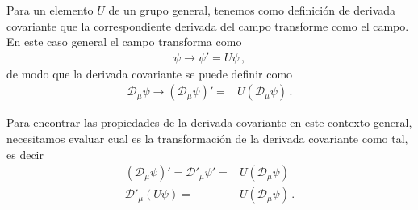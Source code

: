 Para un elemento $U$ de un grupo general, tenemos como definición de derivada covariante que la correspondiente derivada del campo transforme como el campo. En este caso general el campo transforma como
\begin{align}
  \psi\to\psi'=U\psi\,,
\end{align}
de modo que la derivada covariante se puede definir como
\begin{align}
     \mathcal{D}_\mu \psi\to\left(\mathcal{D}_\mu \psi\right)'=&U\left(\mathcal{D}_\mu \psi\right)\,.
\end{align}

Para encontrar las propiedades de la derivada covariante en este contexto general, necesitamos evaluar cual es la transformación de la derivada covariante como tal, es decir
\begin{align}
 \left(\mathcal{D}_\mu \psi\right)'=     \mathcal{D}'_\mu \psi'=&U\left(\mathcal{D}_\mu \psi\right)\nonumber\\
    \mathcal{D}'_\mu \left( U\psi \right)=&U\left(\mathcal{D}_\mu \psi\right)\,.
\end{align}

